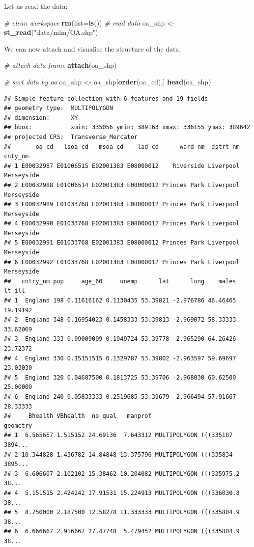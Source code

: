\documentclass[
]{book}
\newenvironment{Shaded}{\begin{snugshade}}{\end{snugshade}}
\newcommand{\CommentTok}[1]{\textcolor[rgb]{0.56,0.35,0.01}{\textit{#1}}}
\newcommand{\DataTypeTok}[1]{\textcolor[rgb]{0.13,0.29,0.53}{#1}}
\newcommand{\KeywordTok}[1]{\textcolor[rgb]{0.13,0.29,0.53}{\textbf{#1}}}
\newcommand{\NormalTok}[1]{#1}
\newcommand{\StringTok}[1]{\textcolor[rgb]{0.31,0.60,0.02}{#1}}
\begin{document}
Let us read the data:

\begin{Shaded}
\begin{Highlighting}[]
\CommentTok{# clean workspace}
\KeywordTok{rm}\NormalTok{(}\DataTypeTok{list=}\KeywordTok{ls}\NormalTok{())}
\CommentTok{# read data}
\NormalTok{oa_shp <-}\StringTok{ }\KeywordTok{st_read}\NormalTok{(}\StringTok{"data/mlm/OA.shp"}\NormalTok{)}
\end{Highlighting}
\end{Shaded}

We can now attach and visualise the structure of the data.

\begin{Shaded}
\begin{Highlighting}[]
\CommentTok{# attach data frame}
\KeywordTok{attach}\NormalTok{(oa_shp)}

\CommentTok{# sort data by oa}
\NormalTok{oa_shp <-}\StringTok{ }\NormalTok{oa_shp[}\KeywordTok{order}\NormalTok{(oa_cd),]}
\KeywordTok{head}\NormalTok{(oa_shp)}
\end{Highlighting}
\end{Shaded}

\begin{verbatim}
## Simple feature collection with 6 features and 19 fields
## geometry type:  MULTIPOLYGON
## dimension:      XY
## bbox:           xmin: 335056 ymin: 389163 xmax: 336155 ymax: 389642
## projected CRS:  Transverse_Mercator
##       oa_cd   lsoa_cd   msoa_cd    lad_cd      ward_nm  dstrt_nm    cnty_nm
## 1 E00032987 E01006515 E02001383 E08000012    Riverside Liverpool Merseyside
## 2 E00032988 E01006514 E02001383 E08000012 Princes Park Liverpool Merseyside
## 3 E00032989 E01033768 E02001383 E08000012 Princes Park Liverpool Merseyside
## 4 E00032990 E01033768 E02001383 E08000012 Princes Park Liverpool Merseyside
## 5 E00032991 E01033768 E02001383 E08000012 Princes Park Liverpool Merseyside
## 6 E00032992 E01033768 E02001383 E08000012 Princes Park Liverpool Merseyside
##   cntry_nm pop     age_60     unemp      lat      long    males   lt_ill
## 1  England 198 0.11616162 0.1130435 53.39821 -2.976786 46.46465 19.19192
## 2  England 348 0.16954023 0.1458333 53.39813 -2.969072 58.33333 33.62069
## 3  England 333 0.09009009 0.1049724 53.39778 -2.965290 64.26426 23.72372
## 4  England 330 0.15151515 0.1329787 53.39802 -2.963597 59.69697 23.03030
## 5  England 320 0.04687500 0.1813725 53.39706 -2.968030 60.62500 25.00000
## 6  England 240 0.05833333 0.2519685 53.39679 -2.966494 57.91667 28.33333
##     Bhealth VBhealth  no_qual   manprof                       geometry
## 1  6.565657 1.515152 24.69136  7.643312 MULTIPOLYGON (((335187 3894...
## 2 10.344828 1.436782 14.84848 13.375796 MULTIPOLYGON (((335834 3895...
## 3  6.606607 2.102102 15.38462 10.204082 MULTIPOLYGON (((335975.2 38...
## 4  5.151515 2.424242 17.91531 15.224913 MULTIPOLYGON (((336030.8 38...
## 5  8.750000 2.187500 12.58278 11.333333 MULTIPOLYGON (((335804.9 38...
## 6  6.666667 2.916667 27.47748  5.479452 MULTIPOLYGON (((335804.9 38...
\end{verbatim}
\end{document}
